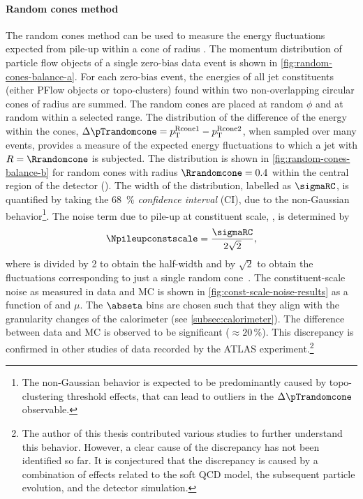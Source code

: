 \paragraph{Random cones method} The random cones method can be used to measure the energy fluctuations expected from pile-up within a cone of radius \Rrandomcone. The momentum distribution of particle flow objects of a single zero-bias data event is shown in \cref{fig:random-cones-balance-a}.
For each zero-bias event, the energies of all jet constituents (either PFlow objects or topo-clusters) found within two non-overlapping circular cones of radius \Rrandomcone are summed.
The random cones are placed at random $\phi$ and at random \abseta within a selected range.
The distribution of the difference of the energy within the cones, $\Delta \pTrandomcone = p_{\text{T}}^{\text{Rcone1}} - p_{\text{T}}^\text{Rcone2}$, when sampled over many events, provides a measure of the expected energy fluctuations to which a jet with $R = \Rrandomcone$ is subjected.
The distribution is shown in \cref{fig:random-cones-balance-b} for random cones with radius $\Rrandomcone = 0.4$ within the central region of the detector (). The width of the distribution, labelled as $\sigmaRC$, is quantified by taking the \SI{68}{\percent} \emph{confidence interval} (CI), due to the non-Gaussian behavior\footnote{The non-Gaussian behavior is expected to be predominantly caused by topo-clustering threshold effects, that can lead to outliers in the $\Delta \pTrandomcone$ observable.}.
The noise term due to pile-up at constituent scale, \Npileupconstscale, is determined by
\begin{equation}
    \Npileupconstscale = \frac{\sigmaRC}{2\sqrt{2}},
\end{equation}
where \sigmaRC is divided by 2 to obtain the half-width and by $\sqrt{2}$ to obtain the fluctuations corresponding to just a single random cone~\cite{JETM-2018-05}.
The constituent-scale noise as measured in data and MC is shown in \cref{fig:const-scale-noise-results} as a function of \abseta and $\mu$.
The $\abseta$ bins are chosen such that they align with the granularity changes of the calorimeter (see \cref{subsec:calorimeter}). 
The difference between data and MC is observed to be significant ($\approx 20\,\%$). This discrepancy is confirmed in other studies of data recorded by the ATLAS experiment.\footnote{The author of this thesis contributed various studies to further understand this behavior. However, a clear cause of the discrepancy has not been identified so far. It is conjectured that the discrepancy is caused by a combination of effects related to the soft QCD model, the subsequent particle evolution, and the detector simulation.}
